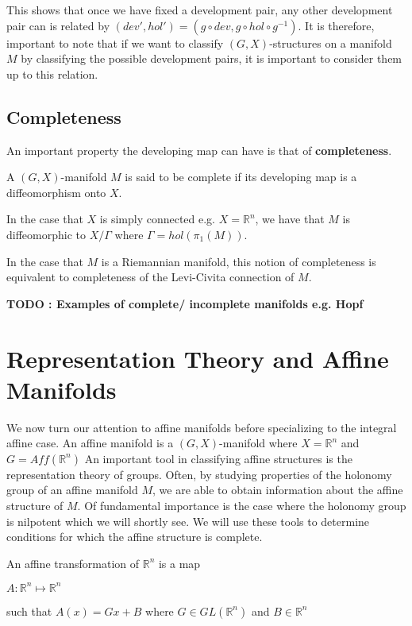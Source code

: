 This shows that once we have fixed a development pair, any other development
pair can is related by $(dev', hol') = (g\circ dev, g\circ hol \circ g^{-1})$.
It is therefore, important to note that if we want to classify
$(G,X)$-structures on a manifold $M$ by classifying the possible development
pairs, it is important to consider them up to this relation.

\subsection{Completeness}
An important property the developing map can have is that of
\textbf{completeness}.
\begin{definition}
    A $(G,X)$-manifold $M$ is said to be complete if its developing map is a diffeomorphism
    onto $X$.
\end{definition}
In the case that $X$ is simply connected e.g. $X= \mathbb{R}^n$, we have that $M$ is diffeomorphic
to $X/\Gamma$ where $\Gamma = hol(\pi_1(M))$.

In the case that $M$ is a Riemannian manifold, this notion of completeness is
equivalent to completeness of the Levi-Civita connection of $M$.

\textbf{TODO :
    Examples of complete/ incomplete manifolds e.g. Hopf}
\section{Representation Theory and Affine Manifolds}
We now turn our attention to affine manifolds before specializing to the
integral affine case. An affine manifold is a $(G,X)$-manifold where $X =
    \mathbb{R}^n$ and $G = Aff(\mathbb{R}^n)$ An important tool in classifying
affine structures is the representation theory of groups. Often, by studying
properties of the holonomy group of an affine manifold $M$, we are able to
obtain information about the affine structure of $M$. Of fundamental importance
is the case where the holonomy group is nilpotent which we will shortly see. We
will use these tools to determine conditions for which the affine structure is
complete.

\begin{definition}
    An affine transformation of $\mathbb{R}^n$ is a map
    \begin{center}
        $A: \mathbb{R}^n \mapsto \mathbb{R}^n$
    \end{center}
    such that $A(x) = Gx + B$ where $G \in GL(\mathbb{R}^n)$ and $B \in\mathbb{R}^n$
\end{definition}

